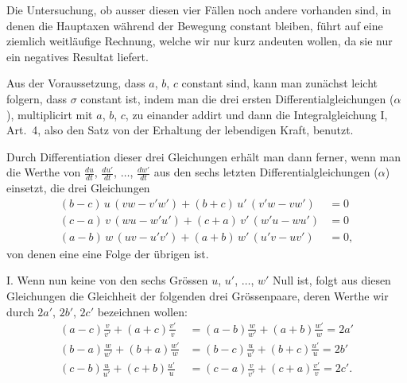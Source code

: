 \documentclass[12pt,a4paper]{article}
\begin{document}
Die Untersuchung, ob ausser diesen vier Fällen noch andere vorhanden sind, in denen die Hauptaxen während der Bewegung constant bleiben, führt auf eine ziemlich weitläufige Rechnung, welche wir nur kurz andeuten wollen, da sie nur ein negatives Resultat liefert.

Aus der Voraussetzung, dass $a$, $b$, $c$ constant sind, kann man zunächst leicht folgern, dass $\sigma$ constant ist, indem man die drei ersten Differentialgleichungen ($\alpha$), multiplicirt mit $a$, $b$, $c$, zu einander addirt und dann die Integralgleichung I, Art.~4, also den Satz von der Erhaltung der lebendigen Kraft, benutzt.

Durch Differentiation dieser drei Gleichungen erhält man dann ferner, wenn man die Werthe von $\frac{du}{dt}$, $\frac{du'}{dt}$, $\ldots$, $\frac{dw'}{dt}$ aus den sechs letzten Differentialgleichungen ($\alpha$) einsetzt, die drei Gleichungen
\begin{equation}
\tag{1}
\begin{aligned}
(b-c)\,u\,(vw - v'w') + (b+c)\,u'\,(v'w - vw') &= 0\\
(c-a)\,v\,(wu - w'u') + (c+a)\,v'\,(w'u - wu') &= 0\\
(a-b)\,w\,(uv - u'v') + (a+b)\,w'\,(u'v - uv') &= 0,
\end{aligned}
\end{equation}
von denen eine eine Folge der übrigen ist.

I. Wenn nun keine von den sechs Grössen $u$, $u'$, $\ldots$, $w'$ Null ist, folgt aus diesen Gleichungen die Gleichheit der folgenden drei Grössenpaare, deren Werthe wir durch $2a'$, $2b'$, $2c'$ bezeichnen wollen:
\begin{align*}
(a-c)\frac{v}{v'} + (a+c)\frac{v'}{v} &= (a-b)\frac{w}{w'} + (a+b)\frac{w'}{w} = 2a'\\
(b-a)\frac{w}{w'} + (b+a)\frac{w'}{w} &= (b-c)\frac{u}{u'} + (b+c)\frac{u'}{u} = 2b'\\
(c-b)\frac{u}{u'} + (c+b)\frac{u'}{u} &= (c-a)\frac{v}{v'} + (c+a)\frac{v'}{v} = 2c'.
\end{align*}
\end{document}
